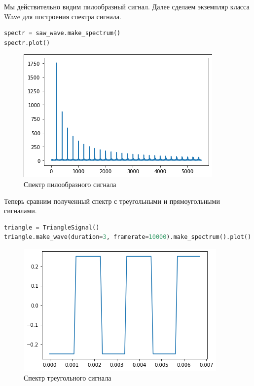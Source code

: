 Мы действительно видим пилообразный сигнал. Далее сделаем экземпляр класса Wave для построения спектра сигнала.

\begin{lstlisting}[language=Python]
spectr = saw_wave.make_spectrum()
spectr.plot()
\end{lstlisting}

\begin{figure}[H]
	\begin{center}
		\includegraphics[scale=1]{fig/lab02/lab2_2.png}
		\caption{Спектр пилообразного сигнала}
	\end{center}
\end{figure}

Теперь сравним полученный спектр с треугольными и прямоугольными сигналами.

\begin{lstlisting}[language=Python]
triangle = TriangleSignal()
triangle.make_wave(duration=3, framerate=10000).make_spectrum().plot()
\end{lstlisting}

\begin{figure}[H]
	\begin{center}
		\includegraphics[scale=1]{fig/lab02/lab2_3.png}
		\caption{Спектр треугольного сигнала}
	\end{center}
\end{figure}


